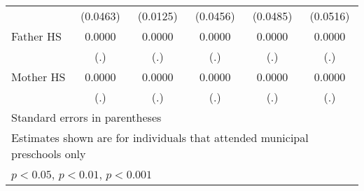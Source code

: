 \begin{table}[htbp]
\begin{tabular}{l*{5}{c}}
            &    (0.0463)         &    (0.0125)         &    (0.0456)         &    (0.0485)         &    (0.0516)         \\
\addlinespace
Father HS   &      0.0000         &      0.0000         &      0.0000         &      0.0000         &      0.0000         \\
            &         (.)         &         (.)         &         (.)         &         (.)         &         (.)         \\
\addlinespace
Mother HS   &      0.0000         &      0.0000         &      0.0000         &      0.0000         &      0.0000         \\
            &         (.)         &         (.)         &         (.)         &         (.)         &         (.)         \\
\bottomrule
\multicolumn{6}{l}{\footnotesize Standard errors in parentheses}\\
\multicolumn{6}{l}{\footnotesize Estimates shown are for individuals that attended municipal preschools only}\\
\multicolumn{6}{l}{\footnotesize \sym{*} \(p<0.05\), \sym{**} \(p<0.01\), \sym{***} \(p<0.001\)}\\
\end{tabular}
\end{table}
